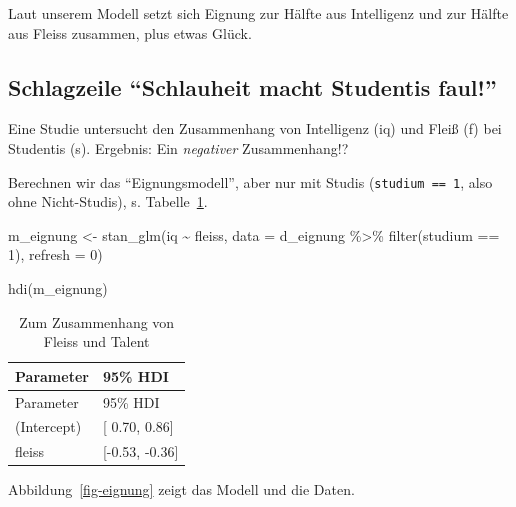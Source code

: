 \documentclass[
  a4paper,
  DIV=11]{scrreprt}
\newenvironment{Shaded}{\begin{snugshade}}{\end{snugshade}}
\newcommand{\AttributeTok}[1]{\textcolor[rgb]{0.40,0.45,0.13}{#1}}
\newcommand{\DecValTok}[1]{\textcolor[rgb]{0.68,0.00,0.00}{#1}}
\newcommand{\FunctionTok}[1]{\textcolor[rgb]{0.28,0.35,0.67}{#1}}
\newcommand{\NormalTok}[1]{\textcolor[rgb]{0.00,0.23,0.31}{#1}}
\newcommand{\OtherTok}[1]{\textcolor[rgb]{0.00,0.23,0.31}{#1}}
\newcommand{\SpecialCharTok}[1]{\textcolor[rgb]{0.37,0.37,0.37}{#1}}
\theoremstyle{definition}
\theoremstyle{remark}
\begin{document}
Laut unserem Modell setzt sich Eignung zur Hälfte aus Intelligenz und
zur Hälfte aus Fleiss zusammen, plus etwas Glück.

\hypertarget{schlagzeile-schlauheit-macht-studentis-faul}{%
\subsection{Schlagzeile ``Schlauheit macht Studentis
faul!''}\label{schlagzeile-schlauheit-macht-studentis-faul}}

Eine Studie untersucht den Zusammenhang von Intelligenz (iq) und Fleiß
(f) bei Studentis (s). Ergebnis: Ein \emph{negativer} Zusammenhang!?

Berechnen wir das ``Eignungsmodell'', aber nur mit Studis
(\texttt{studium\ ==\ 1}, also ohne Nicht-Studis), s.
Tabelle~\ref{tbl-m-eignung}.

\begin{Shaded}
\begin{Highlighting}[]
\NormalTok{m\_eignung }\OtherTok{\textless{}{-}}
  \FunctionTok{stan\_glm}\NormalTok{(iq }\SpecialCharTok{\textasciitilde{}}\NormalTok{ fleiss, }\AttributeTok{data =}\NormalTok{ d\_eignung }\SpecialCharTok{\%\textgreater{}\%}  \FunctionTok{filter}\NormalTok{(studium }\SpecialCharTok{==} \DecValTok{1}\NormalTok{), }\AttributeTok{refresh =} \DecValTok{0}\NormalTok{)}

\FunctionTok{hdi}\NormalTok{(m\_eignung)}
\end{Highlighting}
\end{Shaded}

\hypertarget{tbl-m-eignung}{}
\begin{longtable}[]{@{}ll@{}}
\caption{\label{tbl-m-eignung}Zum Zusammenhang von Fleiss und
Talent}\tabularnewline
\toprule()
Parameter & 95\% HDI \\
\midrule()
\endfirsthead
\toprule()
Parameter & 95\% HDI \\
\midrule()
\endhead
(Intercept) & {[} 0.70, 0.86{]} \\
fleiss & {[}-0.53, -0.36{]} \\
\bottomrule()
\end{longtable}

Abbildung~\ref{fig-eignung} zeigt das Modell und die Daten.
\end{document}
